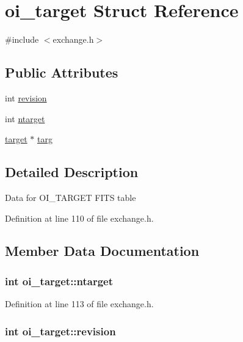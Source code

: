 \hypertarget{structoi__target}{
\section{oi\_\-target Struct Reference}
\label{structoi__target}
}


{\ttfamily \#include $<$exchange.h$>$}

\subsection*{Public Attributes}
\begin{DoxyCompactItemize}
\item 
int \hyperlink{structoi__target_a84119b5d2f0adec9fd1419dd36b132c4}{revision}
\item 
int \hyperlink{structoi__target_a187e5ae557841bd72dce812ac550f51d}{ntarget}
\item 
\hyperlink{structtarget}{target} $\ast$ \hyperlink{structoi__target_a3e9d0fce0b93d3fc406c74d5ca664bff}{targ}
\end{DoxyCompactItemize}


\subsection{Detailed Description}
Data for OI\_\-TARGET FITS table 

Definition at line 110 of file exchange.h.



\subsection{Member Data Documentation}
\hypertarget{structoi__target_a187e5ae557841bd72dce812ac550f51d}{
\subsubsection[{ntarget}]{\setlength{\rightskip}{0pt plus 5cm}int {\bf oi\_\-target::ntarget}}}
\label{structoi__target_a187e5ae557841bd72dce812ac550f51d}


Definition at line 113 of file exchange.h.

\hypertarget{structoi__target_a84119b5d2f0adec9fd1419dd36b132c4}{
\subsubsection[{revision}]{\setlength{\rightskip}{0pt plus 5cm}int {\bf oi\_\-target::revision}}}
\label{structoi__target_a84119b5d2f0adec9fd1419dd36b132c4}


